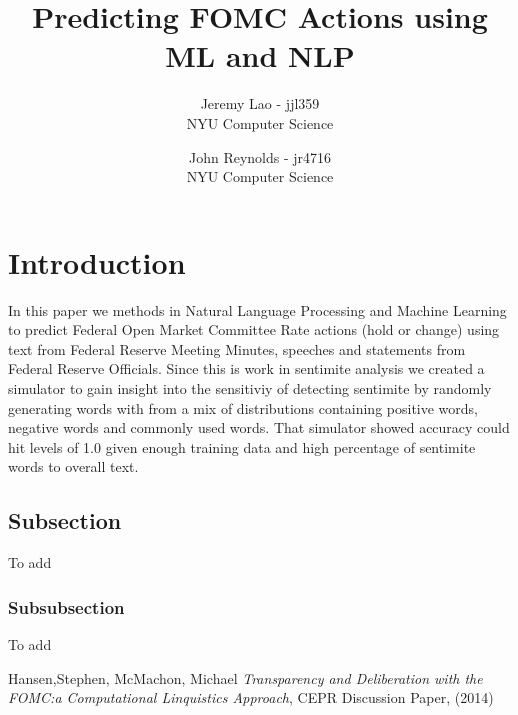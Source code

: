 \documentclass{article}
\title{Predicting FOMC Actions using ML and NLP}
\author{
        Jeremy Lao - jjl359 \\
        NYU Computer Science \\
            \and
        John Reynolds - jr4716 \\
        NYU Computer Science \\
}
\begin{document}
\maketitle


\section{Introduction}
In this paper we methods in Natural Language Processing and Machine Learning to predict Federal Open Market 
Committee Rate actions (hold or change) using text from Federal Reserve Meeting Minutes, speeches and statements 
from Federal Reserve Officials.  Since this is work in sentimite analysis we created a simulator to 
gain insight into the sensitiviy of detecting sentimite by randomly generating words with from a mix
of distributions containing positive words, negative words and commonly used words.  That simulator
showed accuracy could hit levels of 1.0 given enough training data and high percentage of sentimite words
to overall text.



\subsection{Subsection}\label{sec:nothing}

To add

\subsubsection{Subsubsection}\label{sec:nothing2}

To add

\begin{thebibliography}{99}

 Hansen,Stephen, McMachon, Michael  \emph{Transparency and Deliberation with the FOMC:a Computational Linquistics Approach}, CEPR Discussion Paper, (2014)

\end{thebibliography}
\end{document}
